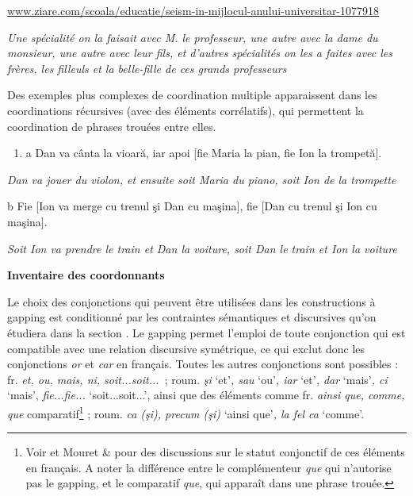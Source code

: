 \textstyleapplestylespan{   }  \href{http://www.ziare.com/scoala/educatie/seism-in-mijlocul-anului-universitar-1077918}{{www.ziare.com/scoala/educatie/seism-in-mijlocul-anului-universitar-1077918}}\textstyleapplestylespan{)}

{\itshape
Une spécialité on la faisait avec M. le professeur, une autre avec la dame du monsieur, une autre avec leur fils, et d'autres spécialités on les a faites avec les frères, les filleuls et la belle-fille de ces grands professeurs } 

Des exemples plus complexes de coordination multiple apparaissent dans les coordinations récursives (avec des éléments corrélatifs), qui permettent la coordination de phrases trouées entre elles.


\begin{enumerate}
\item a  Dan va cânta la vioară, iar apoi [fie Maria la pian, fie Ion la trompetă].


\end{enumerate}
{\itshape
Dan va jouer du violon, et ensuite soit Maria du piano, soit Ion de la trompette} 

  b  Fie [Ion va merge cu trenul şi Dan cu maşina], fie [Dan cu trenul şi Ion cu maşina].

{\itshape
Soit Ion va prendre le train et Dan la voiture, soit Dan le train et Ion la voiture } 

{\bfseries
Inventaire des coordonnants}

Le choix des conjonctions qui peuvent être utilisées dans les constructions à gapping est conditionné par les contraintes sémantiques et discursives qu'on étudiera dans la section . Le gapping permet l'emploi de toute conjonction qui est compatible avec une relation discursive symétrique, ce qui exclut donc les conjonctions \textit{or} et \textit{car} en français. Toutes les autres conjonctions sont possibles : fr. \textit{et, ou, mais, ni, soit...soit...~}; roum. \textit{şi} `et'\textit{, sau} `ou'\textit{, iar} `et'\textit{, dar} `mais'\textit{, ci} `mais', \textit{fie...fie...} `soit...soit...', ainsi que des éléments comme fr. \textit{ainsi que, comme, que} comparatif\footnote{Voir \citet{Mouret2007} et Mouret \& \citet{Desmets2008} pour des discussions sur le statut conjonctif de ces éléments en français. A noter la différence entre le complémenteur \textit{que} qui n'autorise pas le gapping, et le comparatif \textit{que}, qui apparaît dans une phrase trouée. } ; roum. \textit{ca (şi), precum (şi)} `ainsi que'\textit{, la fel ca} `comme'. 

